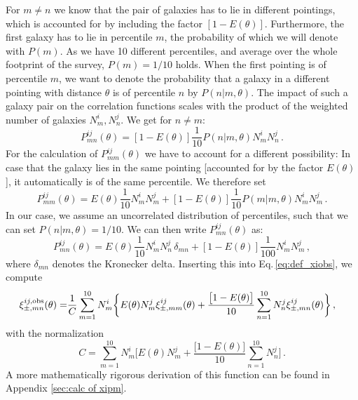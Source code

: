For $m\neq n$ we know that the pair of galaxies has to lie in different pointings, which is accounted for by including the factor $[1-E(\theta)]$. Furthermore, the first galaxy has to lie in percentile $m$, the probability of which we will denote with $P(m)$. As we have 10 different percentiles, and average over the whole footprint of the survey, $P(m)=1/10$ holds. When the first pointing is of percentile $m$, we want to denote the probability that a galaxy in a different pointing with distance $\theta$ is of percentile $n$ by $P(n|m,\theta)$. The impact of such a galaxy pair on the correlation functions scales with the product of the weighted number of galaxies $N_m^i,N_n^j$. We get for $n\neq m$: \[
P_{mn}^{ij}(\theta) = [1-E(\theta)]\frac{1}{10}P(n|m,\theta) N_m^i N_n^j\, .
\label{eq:pmnij_corr1}
\]
For the calculation of $P_{mm}^{ij}(\theta)$ we have to account for a different possibility: In case that the galaxy lies in the same pointing [accounted for by the factor $E(\theta)$], it automatically is of the same percentile. We therefore set \[
P_{mm}^{ij}(\theta) = E(\theta)\frac{1}{10} N_m^iN_m^j + [1-E(\theta)]\frac{1}{10}P(m|m,\theta) N_m^i N_m^j \, .
\label{eq:pmnij_corr2}
\]
In our case, we assume an uncorrelated distribution of percentiles, such that we can set $P(n|m,\theta)=1/10$. We can then write $P_{mn}^{ij}(\theta)$ as: \[
P_{mn}^{ij}(\theta) = E(\theta)\frac{1}{10} N_m^iN_n^j\,\delta_{mn} + [1-E(\theta)]\frac{1}{100} N_m^i N_m^j \, ,
\label{eq:pmnij_uncorr}
\]
where $\delta_{mn}$ denotes the Kronecker delta.
Inserting this into Eq.\,\eqref{eq:def_xiobs}, we compute
\begin{align}
\xi_{\pm,mn}^{ij,\rm{obs}}(\theta) = & \frac{1}{C}\sum_{m=1}^{10} N_m^i \bigg\{ E(\theta) N_m^j \xi_{\pm,mm}^{ij}(\theta) + \frac{\big[1-E(\theta)\big]}{10}\sum_{n=1}^{10}N_n^j \xi_{\pm,mn}^{ij}(\theta)\bigg\}\, ,
\label{eq:correctionfunction1}
\end{align}
with the normalization
\[
C = \sum_{m=1}^{10} N_m^i \bigg[ E(\theta)  N_m^j + \frac{\big[1-E(\theta)\big]}{10}\sum_{n=1}^{10} N_n^j\bigg]\, .
\]
A more mathematically rigorous derivation of this function can be found in Appendix \ref{sec:calc of xipm}.

